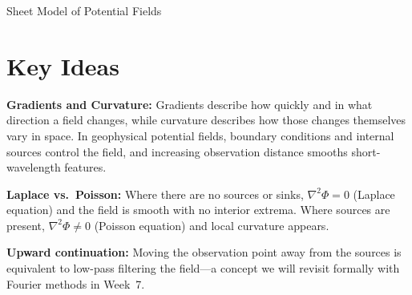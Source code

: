 \begin{activity}{Sheet Model of Potential Fields}
\begin{questions}
\end{questions}

\section*{Key Ideas}
\textbf{Gradients and Curvature:} Gradients describe how quickly and in what direction a field changes, while curvature describes how those changes themselves vary in space. In geophysical potential fields, boundary conditions and internal sources control the field, and increasing observation distance smooths short-wavelength features.

\textbf{Laplace vs.\ Poisson:} Where there are no sources or sinks, $\nabla^2\Phi = 0$ (Laplace equation) and the field is smooth with no interior extrema. Where sources are present, $\nabla^2\Phi \neq 0$ (Poisson equation) and local curvature appears.

\textbf{Upward continuation:} Moving the observation point away from the sources is equivalent to low-pass filtering the field---a concept we will revisit formally with Fourier methods in Week~7.

\end{activity}